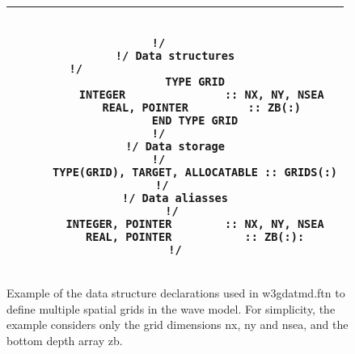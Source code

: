 \begin{figure}
\begin{center} \begin{tabular}{|c|} \hline 
\begin{minipage}[t]{4.5in}
\begin{verbatim}

!/     
!/ Data structures
!/                              
      TYPE GRID
        INTEGER               :: NX, NY, NSEA
        REAL, POINTER         :: ZB(:)
      END TYPE GRID
!/     
!/ Data storage
!/     
      TYPE(GRID), TARGET, ALLOCATABLE :: GRIDS(:)
!/    
!/ Data aliasses
!/ 
      INTEGER, POINTER        :: NX, NY, NSEA
      REAL, POINTER           :: ZB(:):
!/

\end{verbatim}
\end{minipage} \\ \hline
\end{tabular} \end{center}

\caption{Example of the data structure declarations used in {\file
         w3gdatmd.ftn} to define multiple spatial grids in the wave
         model. For simplicity, the example considers only the grid
         dimensions {\F nx}, {\F ny} and {\F nsea}, and the bottom
         depth array {\F zb}.}
\label{fig:struc_1}

\end{figure}
